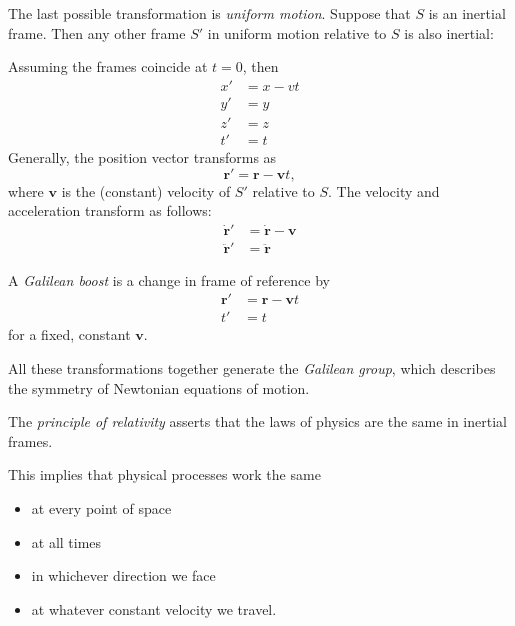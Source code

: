 \documentclass[a4paper]{article}
\begin{document}
The last possible transformation is \emph{uniform motion}. Suppose that $S$ is an inertial frame. Then any other frame $S'$ in uniform motion relative to $S$ is also inertial:
\begin{center}
\end{center}
Assuming the frames coincide at $t = 0$, then
\begin{align*}
  x' &= x - vt\\
  y' &= y\\
  z' &= z\\
  t' &= t
\end{align*}
Generally, the position vector transforms as
\[
  \mathbf{r}' = \mathbf{r} - \mathbf{v}t,
\]
where $\mathbf{v}$ is the (constant) velocity of $S'$ relative to $S$. The velocity and acceleration transform as follows:
\begin{align*}
  \dot{\mathbf{r}}' &= \dot{\mathbf{r}} - \mathbf{v}\\
  \ddot{\mathbf{r}}' &= \ddot{\mathbf{r}}
\end{align*}
\begin{defi}
  A \emph{Galilean boost} is a change in frame of reference by
  \begin{align*}
    \mathbf{r}' &= \mathbf{r} - \mathbf{v}t\\
    t' &= t
  \end{align*}
  for a fixed, constant $\mathbf{v}$.
\end{defi}

All these transformations together generate the \emph{Galilean group}, which describes the symmetry of Newtonian equations of motion.

\begin{law}
  The \emph{principle of relativity} asserts that the laws of physics are the same in inertial frames.
\end{law}

This implies that physical processes work the same
\begin{itemize}
  \item at every point of space
  \item at all times
  \item in whichever direction we face
  \item at whatever constant velocity we travel.
\end{itemize}
\end{document}
